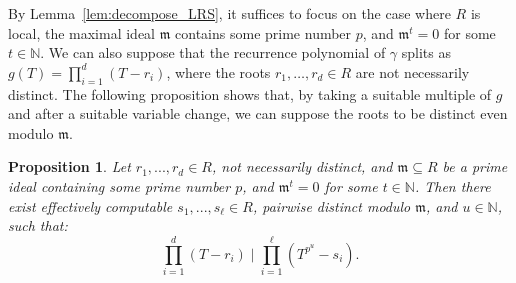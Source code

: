 \documentclass[letterpaper, 11pt, thm-restate]{article}
\numberwithin{equation}{section}
\newcommand{\N}{\mathbb{N}}
\newcommand{\frm}{\mathfrak{m}}
\newtheorem{proposition}[theorem]{Proposition}
\theoremstyle{definition}
\theoremstyle{definition}
\theoremstyle{definition}
\begin{document}
By Lemma~\ref{lem:decompose_LRS}, it suffices to focus on the case where $R$ is local, the maximal ideal $\frm$ contains some prime number $p$, and $\frm^t = 0$ for some $t \in \N$.
We can also suppose that the recurrence polynomial of $\gamma$ splits as $g(T) = \prod_{i = 1}^d(T-r_i)$, where the roots $r_1, \ldots, r_d \in R$ are not necessarily distinct.
The following proposition shows that, by taking a suitable multiple of $g$ and after a suitable variable change, we can suppose the roots to be distinct even modulo $\frm$.

\begin{proposition}\label{prop:seperable_pol}
    Let $r_1,...,r_d\in R$, not necessarily distinct, and $\frm \subseteq R$ be a prime ideal containing some prime number $p$, and $\frm^t=0$ for some $t \in \N$. Then there exist effectively computable $s_1,...,s_{\ell}\in R$, pairwise distinct modulo $\frm$, and $u\in\N$, such that:
    \begin{equation}\label{eq:sep_pol}
    \prod_{i = 1}^d(T-r_i) \;\Big|\; \prod_{i = 1}^{\ell} \left(T^{p^u}-s_i \right).
    \end{equation}
\end{proposition}
\end{document}
